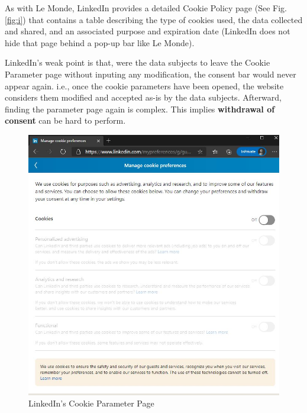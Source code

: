 \documentclass[twocolumn, letterpaper]{scrartcl}
\begin{document}
	    As with Le Monde, LinkedIn provides a detailed Cookie Policy page\cite{LI_CN} (See Fig. \ref{fig:i}) that contains a table describing the type of cookies used, the data collected and shared, and an associated purpose and expiration date (LinkedIn does not hide that page behind a pop-up bar like Le Monde).
	    
	    LinkedIn's weak point is that, were the data subjects to leave the Cookie Parameter page without inputing any modification, the consent bar would never appear again. i.e., once the cookie parameters have been opened, the website considers them modified and accepted as-is by the data subjects. Afterward, finding the parameter page again is complex. This implies \textbf{withdrawal of consent} can be hard to perform.

        \begin{figure}[tbp]	
        \includegraphics[width=0.9\linewidth]{ld_cn.JPG}
        \caption{LinkedIn's Cookie Parameter Page \label{fig:h}}
        \end{figure}
        
\end{document}

